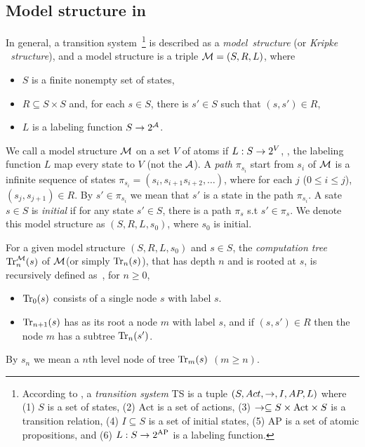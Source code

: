 \documentclass{article}
\begin{document}
\subsection{Model structure in \CTL}
In general, a transition system~\footnote{According to \cite{Baier:PMC:2008},
a {\em transition system} TS is a tuple $(S, Act,\rightarrow,I, AP, L)$ where
(1) $S$ is a set of states,
(2) $\textrm{Act}$ is a set of actions,
(3) $\rightarrow\subseteq S\times \textrm{Act}\times S$ is a transition relation,
(4) $I\subseteq S$ is a set of initial states,
(5) $\textrm{AP}$ is a set of atomic propositions, and
(6) $L:S\rightarrow 2^{\textrm{AP}}$ is a labeling function.} is described as a \emph{model\ structure} (or \emph{Kripke \ structure}), and a model structure is a triple ${\cal M}=(S,R,L)$, where
\begin{itemize}
  \item $S$ is a finite nonempty set of states,
  \item $R\subseteq S\times S$ and, for each $s\in S$, there
  is $s'\in S$ such that $(s,s')\in R$,
  \item $L$ is a labeling function $S\rightarrow 2^{\cal A}$.
\end{itemize}
We call a model structure ${\cal M}$ on a set $V$ of atoms if $L: S \rightarrow 2^V$, \ie, the labeling function $L$ map every state to $V$ (not the ${\cal A}$).  A \emph{path} $\pi_{s_i}$ start from $s_i$ of ${\cal M}$ is a infinite sequence of states $\pi_{s_i}=(s_i, s_{i+1} s_{i+2},\dots)$, where for each $j$ ($0\leq i\leq j$), $(s_j, s_{j+1}) \in R$. By $s'\in \pi_{s_i}$ we mean that $s'$ is a state in the path $\pi_{s_i}$.
A sate $s\in S$ is {\em initial} if for any state $s'\in S$, there is a path $\pi_s$ s.t $s'\in \pi_s$.
We denote this model structure as $(S,R,L,s_0)$, where $s_0$ is initial.

For a given model structure $(S,R,L,s_0)$ and $s\in S$,
the {\em computation tree}
$\textrm{Tr}_n^{\cal M}(s)$ of $\cal M$(or simply $\textrm{Tr}_n(s)$), that has depth $n$ and is rooted at $s$, is recursively defined as~\cite{DBLP:journals/tcs/BrowneCG88}, for $n\ge 0$,
\begin{itemize}
  \item $\textrm{Tr}_0(s)$ consists of a single node $s$ with label $s$.
  \item $\textrm{Tr}_{n+1}(s)$ has as its root a node $m$ with label  $s$, and
  if $(s,s')\in R$ then the node $m$ has a subtree $\textrm{Tr}_n(s')$.
\end{itemize}
By $s_n$ we mean a $n$th level node of tree $\textrm{Tr}_m(s)$ $(m \geq n)$.
\end{document}
